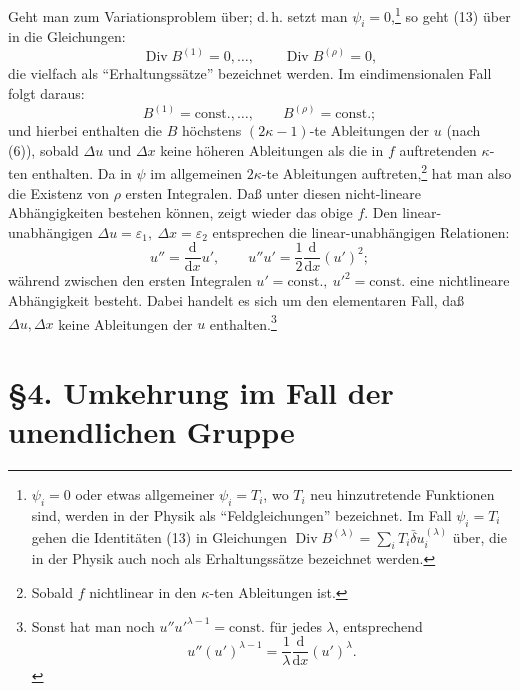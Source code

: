 \documentclass[11pt]{article}
\newcommand{\dd}{\mathrm d}
\newcommand{\Div}{\operatorname{Div}}
\newcommand{\D}{\Delta}
\newcommand{\bd}{\bar{\delta}}
\newcommand{\eps}{\varepsilon}
\begin{document}
Geht man zum Variationsproblem über; d.\,h. setzt man \(\psi_i=0\),\footnote{\(\psi_i=0\) oder etwas allgemeiner \(\psi_i=T_i\), wo \(T_i\) neu hinzutretende Funktionen sind, werden in der Physik als ``Feldgleichungen'' bezeichnet. Im Fall \(\psi_i=T_i\) gehen die Identitäten (13) in Gleichungen \(\Div B^{(\lambda)}=\sum_i T_i\bd u_i^{(\lambda)}\) über, die in der Physik auch noch als Erhaltungssätze bezeichnet werden.} so geht (13) über in die Gleichungen:
\[
\Div B^{(1)}=0,\ldots,\qquad \Div B^{(\rho)}=0,
\]
die vielfach als ``Erhaltungssätze'' bezeichnet werden. Im eindimensionalen Fall folgt daraus:
\[
B^{(1)}=\mathrm{const.},\ldots,\qquad B^{(\rho)}=\mathrm{const.};
\]
und hierbei enthalten die \(B\) höchstens \((2\kappa-1)\)-te Ableitungen der \(u\) (nach (6)), sobald \(\D u\) und \(\D x\) keine höheren Ableitungen als die in \(f\) auftretenden \(\kappa\)-ten enthalten. Da in \(\psi\) im allgemeinen \(2\kappa\)-te Ableitungen auftreten,\footnote{Sobald \(f\) nichtlinear in den \(\kappa\)-ten Ableitungen ist.} hat man also die Existenz von \(\rho\) ersten Integralen. Daß unter diesen nicht-lineare Abhängigkeiten bestehen können, zeigt wieder das obige \(f\). Den linear-unabhängigen \(\D u=\eps_1,\ \D x=\eps_2\) entsprechen die linear-unabhängigen Relationen:
\[
u''=\frac{\dd}{\dd x}u',\qquad
u''u'=\frac12\frac{\dd}{\dd x}(u')^2;
\]
während zwischen den ersten Integralen \(u'=\mathrm{const.},\ u'^2=\mathrm{const.}\) eine nichtlineare Abhängigkeit besteht. Dabei handelt es sich um den elementaren Fall, daß \(\D u,\D x\) keine Ableitungen der \(u\) enthalten.\footnote{Sonst hat man noch \(u''u'^{\lambda-1}=\mathrm{const.}\) für jedes \(\lambda\), entsprechend
\[
u''(u')^{\lambda-1}=\frac1\lambda\frac{\dd}{\dd x}(u')^\lambda.
\]}

\section*{\S{}4. Umkehrung im Fall der unendlichen Gruppe}
\end{document}
